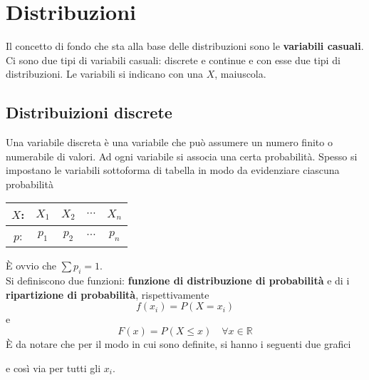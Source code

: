 
\section{Distribuzioni}
Il concetto di fondo che sta alla base delle distribuzioni sono le \textbf{variabili casuali}. Ci 
sono due tipi di variabili casuali: discrete e continue e con esse due tipi di distribuzioni. Le
variabili si indicano con una $X$, maiuscola.

\subsection{Distribuizioni discrete}
Una variabile discreta è una variabile che può assumere un numero finito o numerabile di valori. Ad
ogni variabile si associa una certa probabilità. Spesso si impostano le variabili sottoforma di 
tabella in modo da evidenziare ciascuna probabilità
\begin{center}
  \begin{tabular}{c c c c c}
    $X$: & $X_1$ & $X_2$ & $\cdots$ & $X_n$\\\midrule
    $p$: & $p_1$ & $p_2$ & $\cdots$ & $p_n$
  \end{tabular}
\end{center}
È ovvio che $\sum p_i = 1$.\\ [\baselineskip]
Si definiscono due funzioni: \textbf{funzione di distribuzione di probabilità} e di i
\textbf{ripartizione di probabilità}, rispettivamente
\begin{equation*}
  f(x_i) = P(X=x_i)
\end{equation*}
e
\begin{equation*}
  F(x) = P(X\leq x)\quad\forall x\in\mathbb{R}
\end{equation*}
È da notare che per il modo in cui sono definite, si hanno i seguenti due grafici
\begin{center}
\end{center}
e così via per tutti gli $x_i$.
\begin{center}
\end{center}
